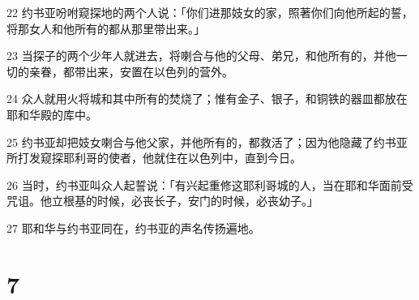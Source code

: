 \par 22 约书亚吩咐窥探地的两个人说：「你们进那妓女的家，照著你们向他所起的誓，将那女人和他所有的都从那里带出来。」
\par 23 当探子的两个少年人就进去，将喇合与他的父母、弟兄，和他所有的，并他一切的亲眷，都带出来，安置在以色列的营外。
\par 24 众人就用火将城和其中所有的焚烧了；惟有金子、银子，和铜铁的器皿都放在耶和华殿的库中。
\par 25 约书亚却把妓女喇合与他父家，并他所有的，都救活了；因为他隐藏了约书亚所打发窥探耶利哥的使者，他就住在以色列中，直到今日。
\par 26 当时，约书亚叫众人起誓说：「有兴起重修这耶利哥城的人，当在耶和华面前受咒诅。他立根基的时候，必丧长子，安门的时候，必丧幼子。」
\par 27 耶和华与约书亚同在，约书亚的声名传扬遍地。

\chapter{7}

